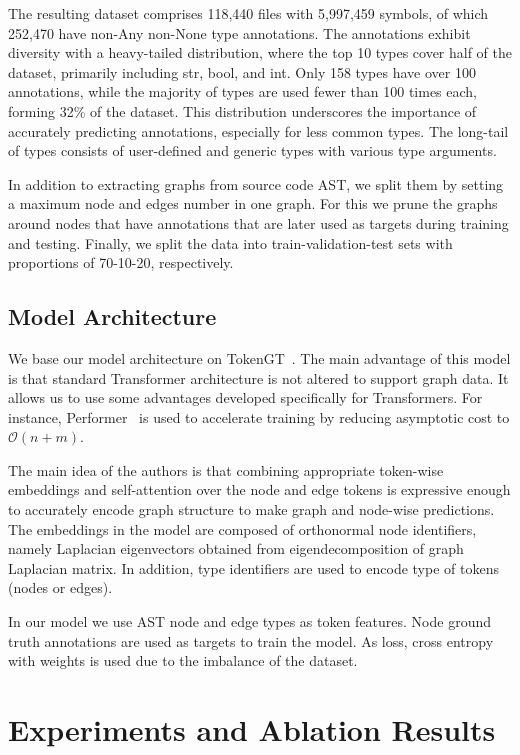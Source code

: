 \documentclass[conference]{IEEEtran}
\begin{document}
The resulting dataset comprises 118,440 files with 5,997,459 symbols, of which 252,470 have non-Any non-None type annotations.
The annotations exhibit diversity with a heavy-tailed distribution, where the top 10 types cover half of the dataset, primarily including str, bool, and int.
Only 158 types have over 100 annotations, while the majority of types are used fewer than 100 times each, forming 32\% of the dataset.
This distribution underscores the importance of accurately predicting annotations, especially for less common types.
The long-tail of types consists of user-defined and generic types with various type arguments.

In addition to extracting graphs from source code AST, we split them by setting a maximum node and edges number in one graph.
For this we prune the graphs around nodes that have annotations that are later used as targets during training and testing.
Finally, we split the data into train-validation-test sets with proportions of 70-10-20, respectively.

\subsection{Model Architecture}\label{subsec:model-architecture}

We base our model architecture on TokenGT~\cite{kim_pure_2022}.
The main advantage of this model is that standard Transformer architecture is not altered to support graph data.
It allows us to use some advantages developed specifically for Transformers.
For instance, Performer~\cite{choromanski_rethinking_2020} is used to accelerate training by reducing asymptotic cost to
$\mathcal{O}(n+m)$.

The main idea of the authors is that combining appropriate token-wise embeddings and self-attention over the node and edge tokens
is expressive enough to accurately encode graph structure to make graph and node-wise predictions.
The embeddings in the model are composed of orthonormal node identifiers, namely Laplacian eigenvectors obtained from
eigendecomposition of graph Laplacian matrix.
In addition, type identifiers are used to encode type of tokens (nodes or edges).

In our model we use AST node and edge types as token features.
Node ground truth annotations are used as targets to train the model.
As loss, cross entropy with weights is used due to the imbalance of the dataset.

\section{Experiments and Ablation Results}\label{sec:experiment-results-and-ablation}
\end{document}
